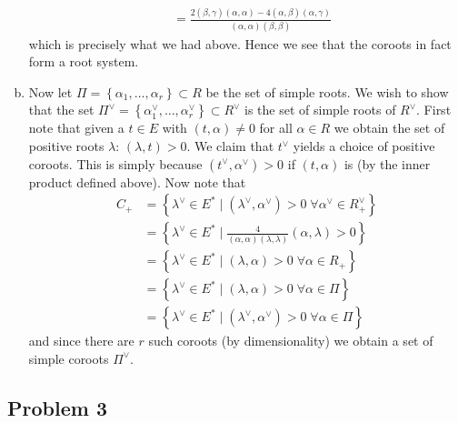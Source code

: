 \documentclass{../../mathnotes}
\begin{document}
\begin{enumerate}[(a)]
\begin{align*}
            &=\frac{2(\beta,\gamma)(\alpha,\alpha)-4(\alpha,\beta)(\alpha,\gamma)}{(\alpha,\alpha)(\beta,\beta)}
        \end{align*}
        which is precisely what we had above. Hence we see that the coroots in fact form a root system.
    \item Now let $\Pi=\left\{ \alpha_1,\ldots,\alpha_r \right\}\subset R$ be the set of simple roots. We wish to show
        that the set $\Pi^\vee=\left\{ \alpha_1^\vee,\ldots,\alpha_r^\vee \right\}\subset R^\vee$ is the set of
        simple roots of $R^\vee$. First note that given a $t\in E$ with $(t,\alpha)\neq 0$ for all $\alpha\in R$ we obtain
        the set of positive roots $\lambda$: $(\lambda,t)>0$. We claim that $t^\vee$ yields a choice of positive coroots.
        This is simply because $(t^\vee,\alpha^\vee)>0$ if $(t,\alpha)$ is (by the inner product defined above).
        Now note that
        \begin{align*}
            C_+&=\left\{ \lambda^\vee\in E^*\mid(\lambda^\vee,\alpha^\vee)>0\; \forall \alpha^\vee\in R_+^\vee \right\}\\
            &=\left\{ \lambda^\vee\in E^*\mid\frac{4}{(\alpha,\alpha)(\lambda,\lambda)}(\alpha,\lambda)>0 \right\}\\
            &=\left\{ \lambda^\vee\in E^*\mid (\lambda,\alpha)>0\; \forall\alpha\in R_+ \right\}\\
            &=\left\{ \lambda^\vee\in E^*\mid (\lambda,\alpha)>0\; \forall\alpha\in \Pi \right\}\\
            &=\left\{ \lambda^\vee\in E^*\mid (\lambda^\vee,\alpha^\vee)>0\; \forall\alpha\in \Pi \right\}
        \end{align*}
        and since there are $r$ such coroots (by dimensionality) we obtain a set of simple coroots $\Pi^\vee$.
\end{enumerate}

\subsection*{Problem 3}
\end{document}
